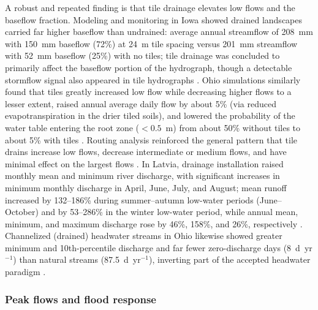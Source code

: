 A robust and repeated finding is that tile drainage elevates low flows and the baseflow fraction. Modeling and monitoring in Iowa showed drained landscapes carried far higher baseflow than undrained: average annual streamflow of 208~mm with 150~mm baseflow (72\%) at 24~m tile spacing versus 201~mm streamflow with 52~mm baseflow (25\%) with no tiles; tile drainage was concluded to primarily affect the baseflow portion of the hydrograph, though a detectable stormflow signal also appeared in tile hydrographs \parencite{Schilling2008}. Ohio simulations similarly found that tiles greatly increased low flow while decreasing higher flows to a lesser extent, raised annual average daily flow by about 5\% (via reduced evapotranspiration in the drier tiled soils), and lowered the probability of the water table entering the root zone ($<0.5$~m) from about 50\% without tiles to about 5\% with tiles \parencite{Rathore2025}. Routing analysis reinforced the general pattern that tile drains increase low flows, decrease intermediate or medium flows, and have minimal effect on the largest flows \parencite{Sloan2017}. In Latvia, drainage installation raised monthly mean and minimum river discharge, with significant increases in minimum monthly discharge in April, June, July, and August; mean runoff increased by 132--186\% during summer--autumn low-water periods (June--October) and by 53--286\% in the winter low-water period, while annual mean, minimum, and maximum discharge rose by 46\%, 158\%, and 26\%, respectively \parencite{Apsite2017}. Channelized (drained) headwater streams in Ohio likewise showed greater minimum and 10th-percentile discharge and far fewer zero-discharge days (8~d~yr$^{-1}$) than natural streams (87.5~d~yr$^{-1}$), inverting part of the accepted headwater paradigm \parencite{King2009}.

\subsubsection{Peak flows and flood response}

